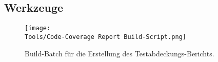 %



\newpage





\subsection*{Werkzeuge}



\begin{figure}[ht]

	\centering
	
	\texttt{[image: \\Tools/Code-Coverage Report Build-Script.png]}
	
	\caption{Build-Batch für die Erstellung des Testabdeckungs-Berichts.}

\end{figure}









